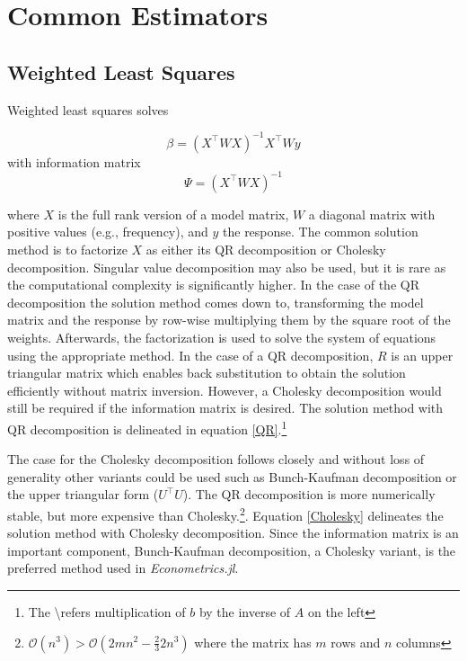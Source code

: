 \documentclass{juliacon}
\begin{document}
\section{Common Estimators}

\subsection{Weighted Least Squares}

Weighted least squares solves

\begin{equation}
	\beta = \left(X^{\top} W X\right)^{-1} X^{\top} W y
\end{equation}
with information matrix
\begin{equation}
\Psi = \left(X^{\top} W X\right)^{-1}
\end{equation}

where $X$ is the full rank version of a model matrix, $W$ a diagonal matrix with positive values (e.g., frequency), and $y$ the response. The common solution method is to factorize $X$ as either its QR decomposition or Cholesky decomposition. Singular value decomposition may also be used, but it is rare as the computational complexity is significantly higher. In the case of the QR decomposition the solution method comes down to, transforming the model matrix and the response by row-wise multiplying them by the square root of the weights. Afterwards, the factorization is used to solve the system of equations using the appropriate method. In the case of a QR decomposition, $R$ is an upper triangular matrix which enables back substitution to obtain the solution efficiently without matrix inversion. However, a Cholesky decomposition would still be required if the information matrix is desired. The solution method with QR decomposition is delineated in equation \ref{QR}.\footnote{The \textbackslash refers multiplication of $b$ by the inverse of $A$ on the left}

The case for the Cholesky decomposition follows closely and without loss of generality other variants could be used such as Bunch-Kaufman decomposition or the upper triangular form ($U^{\top}U$). The QR decomposition is more numerically stable, but more expensive than Cholesky.\footnote{$\mathcal{O}\left(n^{3}\right) > \mathcal{O}\left(2mn^{2}-\frac{2}{3}2n^{3}\right)$ where the matrix has $m$ rows and $n$ columns}. Equation \ref{Cholesky} delineates the solution method with Cholesky decomposition. Since the information matrix is an important component, Bunch-Kaufman decomposition, a Cholesky variant, is the preferred method used in \textit{Econometrics.jl}.
\end{document}
